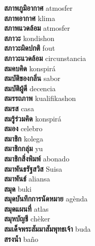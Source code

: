 \textbf{ สภาพภูมิอากาศ  } atmosfer \\
\textbf{ สภาพอากาศ  } klima \\
\textbf{ สภาพแวดล้อม  } atmosfer \\
\textbf{ สภาวะ  } kondishon \\
\textbf{ สภาวะผิดปกติ  } fout \\
\textbf{ สภาวะแวดล้อม  } circunstancia \\
\textbf{ สมคบคิด  } konspirá \\
\textbf{ สมบัติของกลิ่น  } sabor \\
\textbf{ สมบัติผู้ดี  } decencia \\
\textbf{ สมรรถภาพ  } kualifikashon \\
\textbf{ สมรส  } casa \\
\textbf{ สมรู้ร่วมคิด  } konspirá \\
\textbf{ สมอง  } celebro \\
\textbf{ สมาชิก  } kolega \\
\textbf{ สมาชิกกลุ่ม  } yu \\
\textbf{ สมาชิกสิ่งพิมพ์  } abonado \\
\textbf{ สมาพันธรัฐสวิส  } Suisa \\
\textbf{ สมาพันธ์  } aliansa \\
\textbf{ สมุด  } buki \\
\textbf{ สมุดบันทึกการนัดหมาย  } agènda \\
\textbf{ สมุดแผนที่  } atlas \\
\textbf{ สมุหบัญชี  } chèker \\
\textbf{ สมเด็จพระสัมมาสัมพุทธเจ้า  } buda \\
\textbf{ สรงน้ำ  } baño \\
